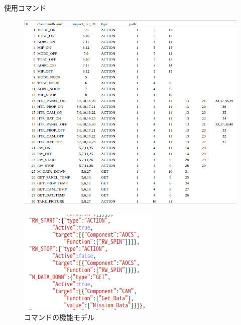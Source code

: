 \documentclass[11pt]{article}
\begin{document}
\newpage
\begin{table}[H]
   \centering
   \caption{使用コマンド}
   \label{tab:command}
\end{table}
\vspace{-2zh}
\begin{figure}[H]
   \centering
      \includegraphics[width=16.5cm]{figure/COM.png}
\end{figure}

\begin{figure}[H]
   \centering
      \includegraphics[height=5.0cm]{figure/COM_type.png}
      \caption{コマンドの機能モデル}
      \label{fig:COM_type}
\end{figure}
\end{document}
